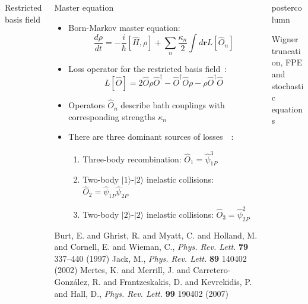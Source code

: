 \documentclass[final,hyperref={pdfpagelabels=false}]{beamer}
\newcommand{\mycolumn}[1]{
	\begin{column}{.5\textwidth}
	\begin{beamercolorbox}[center,wd=\textwidth]{postercolumn}
	\begin{minipage}[T]{.95\textwidth} %

	\parbox[t][\columnheight]{\textwidth}{ #1 }

	\end{minipage}
	\end{beamercolorbox}
	\end{column}
}
\newlength{\columnheight}
\begin{document}
\begin{frame}
\begin{columns}
{\begin{block}{Restricted basis field}
\end{block}

\begin{block}{Master equation}

\begin{itemize}
	\item Born-Markov master equation:
	\[
		\frac{d\rho}{d t} = - \frac{i}{\hbar} [\hat{H}, \rho] +
		\sum\limits_n \frac{\kappa_n}{2} \int\limits d\mathbf{r} L [\hat{O}_n]
	\]
	\item Loss operator for the restricted basis field~\cite{jack}:
		\[ L [\hat{O}] = 2  \hat{O} \rho \hat{O}^\dagger - \hat{O}^\dagger \hat{O} \rho - \rho \hat{O}^\dagger \hat{O} \]
	\item Operators $\hat{O}_n$ describe bath couplings with corresponding strengths $\kappa_n$
	\item There are three dominant sources of losses~\cite{burt}~\cite{mertes}:
	\begin{enumerate}
		\item Three-body recombination: $\hat{O}_1 = \hat{\psi}_{1P}^3$
		\item Two-body $\vert1\rangle$-$\vert2\rangle$ inelastic collisions: $\hat{O}_2 = \hat{\psi}_{1P} \hat{\psi}_{2P}$
		\item Two-body $\vert2\rangle$-$\vert2\rangle$ inelastic collisions: $\hat{O}_3 = \hat{\psi}_{2P}^2$
	\end{enumerate}
\end{itemize}

\tiny{ \begin{thebibliography}{9}
	 Burt, E. and Ghrist, R. and Myatt, C. and Holland, M. and Cornell, E. and Wieman, C.,
		\textit{Phys. Rev. Lett.} \textbf{79} 337--440 (1997)
	 Jack, M., \textit{Phys. Rev. Lett.} \textbf{89} 140402 (2002)
	 Mertes, K. and Merrill, J. and Carretero-Gonz\'alez, R. and Frantzeskakis, D. and Kevrekidis, P. and Hall, D.,
		\textit{Phys. Rev. Lett.} \textbf{99} 190402 (2007)
\end{thebibliography} }

\end{block}

} %

\mycolumn{
            
\begin{block}{Wigner truncation, FPE and stochastic equations}


\end{block}}
\end{columns}
\end{frame}
\end{document}
